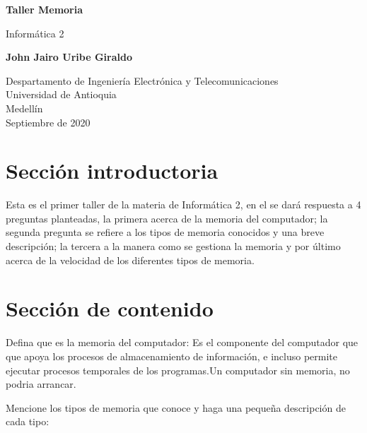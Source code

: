 \documentclass{article}
\begin{document}
\begin{titlepage}
    \begin{center}
        \vspace*{1cm}
            
        \Huge
        \textbf{Taller Memoria}
            
        \vspace{0.5cm}
        \LARGE
        Informática 2
            
        \vspace{1.5cm}
            
        \textbf{John Jairo Uribe Giraldo}
        
            
        \vfill
            
        \vspace{0.8cm}
            
        \Large
        Despartamento de Ingeniería Electrónica y Telecomunicaciones\\
        Universidad de Antioquia\\
        Medellín\\
        Septiembre de 2020
            
    \end{center}
\end{titlepage}

\tableofcontents

\section{Sección introductoria}
Esta es el primer taller de la materia de Informática 2, en el se dará respuesta a 4 preguntas planteadas, la primera acerca de la memoria del computador; la segunda pregunta se refiere a los tipos de memoria conocidos y una breve descripción; la tercera a la manera como se gestiona la memoria y por último acerca de la velocidad de los diferentes tipos de memoria.

\section{Sección de contenido} \label{contenido}

Defina que es la memoria del computador:
Es el componente del computador que  que apoya los procesos de almacenamiento de información, e incluso permite ejecutar procesos temporales de los programas.Un computador sin memoria, no podria arrancar.

Mencione los tipos de memoria que conoce y haga una pequeña descripción de cada tipo:
\end{document}

